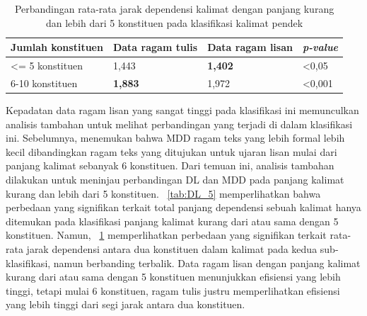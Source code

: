 \begin{table}
\begin{center}
\begin{small}
\caption{Perbandingan rata-rata jarak dependensi kalimat dengan panjang kurang dan lebih dari 5 konstituen pada klasifikasi kalimat pendek}\label{tab:MDD_5}
  \begin{tabular}{ | p{3.2cm} | p{3.2cm} | p{3.2cm} | p{2cm} |}
    \hline
Jumlah konstituen & Data ragam tulis & Data ragam lisan & \textit{p-value} \\ \hline
\textless= 5 konstituen & 1,443 & \textbf{1,402} & \textless 0,05 \\ \hline
6-10 konstituen & \textbf{1,883} & 1,972 & \textless 0,001 \\ \hline
   \end{tabular}
   \end{small}
\end{center}
\end{table}

Kepadatan data ragam lisan yang sangat tinggi pada klasifikasi ini memunculkan analisis tambahan untuk melihat perbandingan yang terjadi di dalam klasifikasi ini. Sebelumnya, \cite{wang2017effects} menemukan bahwa MDD ragam teks yang lebih formal lebih kecil dibandingkan ragam teks yang ditujukan untuk ujaran lisan mulai dari panjang kalimat sebanyak 6 konstituen. Dari temuan ini, analisis tambahan dilakukan untuk meninjau perbandingan DL dan MDD pada panjang kalimat kurang dan lebih dari 5 konstituen. \tab~\ref{tab:DL_5} memperlihatkan bahwa perbedaan yang signifikan terkait total panjang dependensi sebuah kalimat hanya ditemukan pada klasifikasi panjang kalimat kurang dari atau sama dengan 5 konstituen. Namun, \tab~\ref{tab:MDD_5} memperlihatkan perbedaan yang signifikan terkait rata-rata jarak dependensi antara dua konstituen dalam kalimat pada kedua sub-klasifikasi, namun berbanding terbalik. Data ragam lisan dengan panjang kalimat kurang dari atau sama dengan 5 konstituen menunjukkan efisiensi yang lebih tinggi, tetapi mulai 6 konstituen, ragam tulis justru memperlihatkan efisiensi yang lebih tinggi dari segi jarak antara dua konstituen.

